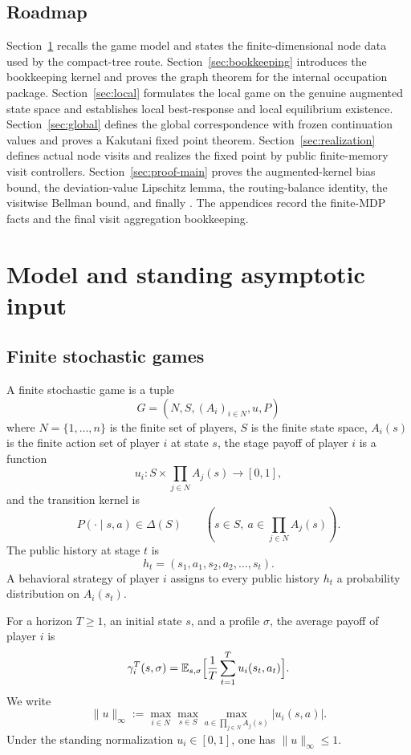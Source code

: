 \documentclass[12pt]{article}
\theoremstyle{definition}
\newcommand{\E}{\mathbb{E}}
\newcommand{\1}{\mathbf{1}}
\begin{document}
\subsection{Roadmap}


Section~\ref{sec:model} recalls the game model and states the finite-dimensional
node data used by the compact-tree route. Section~\ref{sec:bookkeeping}
introduces the bookkeeping kernel and proves the graph theorem for the internal
occupation package. Section~\ref{sec:local} formulates the local game on the
genuine augmented state space and establishes local best-response and local
equilibrium existence. Section~\ref{sec:global} defines the global correspondence
with frozen continuation values and proves a Kakutani fixed point theorem.
Section~\ref{sec:realization} defines actual node visits and realizes the fixed
point by public finite-memory visit controllers. Section~\ref{sec:proof-main}
proves the augmented-kernel bias bound, the deviation-value Lipschitz lemma, the
routing-balance identity, the visitwise Bellman bound, and finally
. The appendices record the finite-MDP facts and the final visit
aggregation bookkeeping.

\section{Model and standing asymptotic input}
\label{sec:model}

\subsection{Finite stochastic games}

A finite stochastic game is a tuple
\[
G=(N,S,(A_i)_{i\in N},u,P)
\]
where $N=\{1,\dots,n\}$ is the finite set of players, $S$ is the finite state
space, $A_i(s)$ is the finite action set of player $i$ at state $s$, the stage
payoff of player $i$ is a function
\[
u_i:S\times \prod_{j\in N}A_j(s)\to [0,1],
\]
and the transition kernel is
\[
P(\cdot\mid s,a)\in \Delta(S)
\qquad (s\in S,\ a\in \prod_{j\in N}A_j(s)).
\]
The public history at stage $t$ is
\[
h_t=(s_1,a_1,s_2,a_2,\dots,s_t).
\]
A behavioral strategy of player $i$ assigns to every public history $h_t$ a
probability distribution on $A_i(s_t)$.

For a horizon $T\ge 1$, an initial state $s$, and a profile $\sigma$, the average
payoff of player $i$ is
\[
\gamma_i^T(s,\sigma)
=
\E_{s,\sigma}\Bigl[\frac1T\sum_{t=1}^T u_i(s_t,a_t)\Bigr].
\]
We write
\[
\|u\|_\infty
:=
\max_{i\in N}\max_{s\in S}\max_{a\in\prod_{j\in N}A_j(s)} |u_i(s,a)|.
\]
Under the standing normalization $u_i\in[0,1]$, one has $\|u\|_\infty\le 1$.
\end{document}
